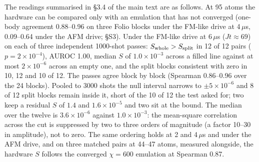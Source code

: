 \documentclass[11pt,a4paper]{article}
\begin{document}
The readings summarised in \S 3.4 of the main text are as follows. At 95 atoms the hardware can be compared only with an emulation that has not converged (one-body agreement 0.88--0.96 on three Folio blocks under the FM-like drive at 4\,$\mu$s, 0.09--0.64 under the AFM drive; \S S3). Under the FM-like drive at 6\,$\mu$s ($Jt\approx69$) on each of three independent 1000-shot passes: $S_{\rm whole}>S_{\rm split}$ in 12 of 12 pairs ($p=2\times10^{-4}$), AUROC 1.00, median $S$ of $1.0\times10^{-3}$ across a filled line against at most $2\times10^{-6}$ across an empty one, and the split blocks consistent with zero in 10, 12 and 10 of 12. The passes agree block by block (Spearman 0.86--0.96 over the 24 blocks). Pooled to 3000 shots the null interval narrows to $\pm5\times10^{-6}$ and 8 of 12 split blocks remain inside it, short of the 10 of 12 the test asked for; two keep a residual $S$ of $1.4$ and $1.6\times10^{-5}$ and two sit at the bound. The median over the twelve is $3.6\times10^{-6}$ against $1.0\times10^{-3}$: the mean-square correlation across the cut is suppressed by two to three orders of magnitude (a factor 10--30 in amplitude), not to zero. The same ordering holds at 2 and 4\,$\mu$s and under the AFM drive, and on three matched pairs at 44--47 atoms, measured alongside, the hardware $S$ follows the converged $\chi=600$ emulation at Spearman 0.87.
\end{document}
